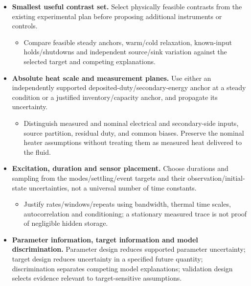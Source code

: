 \begin{itemize}[leftmargin=*]
\item {}\textbf{Smallest useful contrast set.} Select physically feasible contrasts from the existing experimental plan before proposing additional instruments or controls.\cite{zhong2025goaloriented}
\begin{itemize}
\item Compare feasible steady anchors, warm/\allowbreak{}cold relaxation, known-input holds/\allowbreak{}shutdowns and independent source/\allowbreak{}sink variation against the selected target and competing explanations.
\end{itemize}
\item {}\textbf{Absolute heat scale and measurement planes.} Use either an independently supported deposited-duty/\allowbreak{}secondary-energy anchor at a steady condition or a justified inventory/\allowbreak{}capacity anchor, and propagate its uncertainty.
\begin{itemize}
\item Distinguish measured and nominal electrical and secondary-side inputs, source partition, residual duty, and common biases. Preserve the nominal heater assumptions without treating them as measured heat delivered to the fluid.
\end{itemize}
\item {}\textbf{Excitation, duration and sensor placement.} Choose durations and sampling from the modes/\allowbreak{}settling/\allowbreak{}event targets and their observation/\allowbreak{}initial-state uncertainties, not a universal number of time constants.
\begin{itemize}
\item Justify rates/\allowbreak{}windows/\allowbreak{}repeats using bandwidth, thermal time scales, autocorrelation and conditioning; a stationary measured trace is not proof of negligible hidden storage.
\end{itemize}
\item {}\textbf{Parameter information, target information and model discrimination.} Parameter design reduces supported parameter uncertainty; target design reduces uncertainty in a specified future quantity; discrimination separates competing model explanations; validation design selects evidence relevant to target-sensitive assumptions.\cite{zhong2025goaloriented}
\begin{itemize}

\end{itemize}
\end{itemize}
